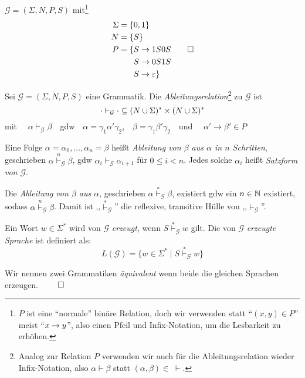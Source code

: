 \begin{Bsp}\label{bsp:3.sameNumber}
  $\mathcal{G} = (\Sigma, N, P, S)$ mit\footnote{$P$ ist eine ``normale'' binäre Relation, 
  doch wir verwenden statt ``$(x,y)\in P$'' meist ``$x\-> y$'', also einen Pfeil und Infix-Notation, um die Lesbarkeit zu erhöhen.}
	\begin{align*}
		\Sigma &= \{ 0, 1 \}\\
		N &= \{S\}\\
		P &= \begin{aligned}[t]
      \{ S & \to 1S0S \\
        S & \to 0S1S \\
        S & \to \varepsilon
      \}
        \end{aligned}
      \qedhere
	\end{align*}
\end{Bsp}
% 
%   
\begin{Def}
  Sei $\mathcal{G} =(\Sigma,N,P,S)$ eine Grammatik.
	Die \emph{Ableitungsrelation}\footnote{Analog zur Relation $P$ verwenden wir auch für die Ableitungsrelation wieder Infix-Notation, also $\alpha\vdash\beta$ statt $(\alpha,\beta)\in\;\vdash$.}
	zu $\mathcal{G}$ ist 
  \begin{displaymath}
    \cdot \vdash_\mathcal{G} \cdot \subseteq (N\cup\Sigma)^*\times(N\cup\Sigma)^*
  \end{displaymath}
  mit \ \ $\alpha \vdash_\mathcal{G} \beta$\ \  gdw\ \  $\alpha = \gamma_1\alpha'\gamma_2$,\ \  $\beta = \gamma_1\beta'\gamma_2$\ \  und \ \ $\alpha' \to \beta' \in P$

  Eine Folge $\alpha = \alpha_0,\ldots,\alpha_n = \beta$ heißt \emph{Ableitung von $\beta$ aus $\alpha$ in $n$ Schritten}, geschrieben $\alpha \stackrel{n}{\vdash}_\mathcal{G} \beta$, gdw $\alpha_i \vdash_\mathcal{G} \alpha_{i+1}$ für $0 \le i < n$.
  Jedes solche $\alpha_i$ heißt \emph{Satzform von $\mathcal{G}$}.

  Die \emph{Ableitung von $\beta$ aus $\alpha$}, geschrieben $\alpha \stackrel{*}{\vdash}_\mathcal{G} \beta$, existiert gdw ein $n \in \mathbb{N}$ existiert, sodass $\alpha \stackrel{n}{\vdash}_\mathcal{G} \beta$.
  Damit ist ,,$\stackrel{*}{\vdash}_\mathcal{G}$'' die reflexive, transitive Hülle von ,,$\vdash_\mathcal{G}$''.

  Ein Wort $w\in\Sigma^*$ wird von $\mathcal{G}$ \emph{erzeugt}, wenn $S \stackrel{*}{\vdash}_{\mathcal{G}} w$ gilt.
	Die von $\mathcal{G}$ \emph{erzeugte Sprache} ist definiert als:
	\[ L(\mathcal{G}) = \{w\in\Sigma^* \mid S \stackrel{*}{\vdash}_{\mathcal{G}} w \}  \]
	
	Wir nennen zwei Grammatiken \emph{äquivalent} wenn beide die gleichen Sprachen erzeugen. $\qedhere$
\end{Def}




